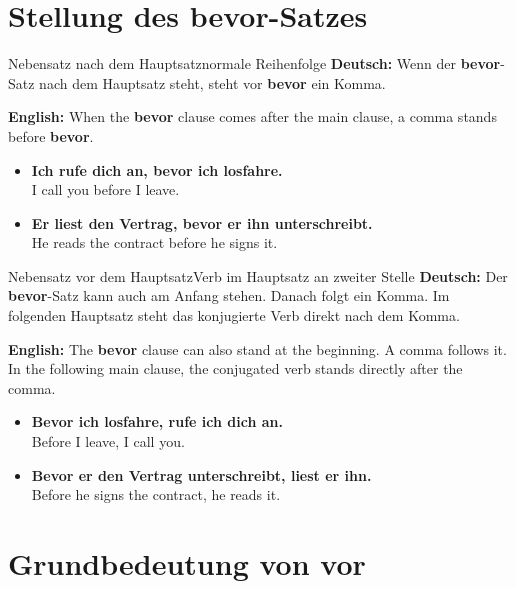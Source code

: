 \documentclass[a4paper,11pt]{article}
\newcommand{\GermanText}[1]{\textbf{Deutsch: }#1\par}
\newcommand{\EnglishText}[1]{{\small\color{SoftGray}\textbf{English: }#1\par}}
\newcommand{\ExampleItem}[2]{\item \textbf{#1}\\{\small\color{SoftGray}#2}}
\begin{document}
    \section{Stellung des \glqq bevor\grqq-Satzes}

        \begin{grammarentry}{Nebensatz nach dem Hauptsatz}{normale Reihenfolge}
            \GermanText{Wenn der \textbf{bevor}-Satz nach dem Hauptsatz steht, steht vor \textbf{bevor} ein Komma.}
            \EnglishText{When the \textbf{bevor} clause comes after the main clause, a comma stands before \textbf{bevor}.}
        \end{grammarentry}

        \begin{exbox}
            \begin{itemize}
                \ExampleItem{Ich rufe dich an, bevor ich losfahre.}{I call you before I leave.}
                \ExampleItem{Er liest den Vertrag, bevor er ihn unterschreibt.}{He reads the contract before he signs it.}
            \end{itemize}
        \end{exbox}

        \begin{grammarentry}{Nebensatz vor dem Hauptsatz}{Verb im Hauptsatz an zweiter Stelle}
            \GermanText{Der \textbf{bevor}-Satz kann auch am Anfang stehen. Danach folgt ein Komma. Im folgenden Hauptsatz steht das konjugierte Verb direkt nach dem Komma.}
            \EnglishText{The \textbf{bevor} clause can also stand at the beginning. A comma follows it. In the following main clause, the conjugated verb stands directly after the comma.}
        \end{grammarentry}

        \begin{exbox}
            \begin{itemize}
                \ExampleItem{Bevor ich losfahre, rufe ich dich an.}{Before I leave, I call you.}
                \ExampleItem{Bevor er den Vertrag unterschreibt, liest er ihn.}{Before he signs the contract, he reads it.}
            \end{itemize}
        \end{exbox}

    \section{Grundbedeutung von \glqq vor\grqq}
\end{document}
